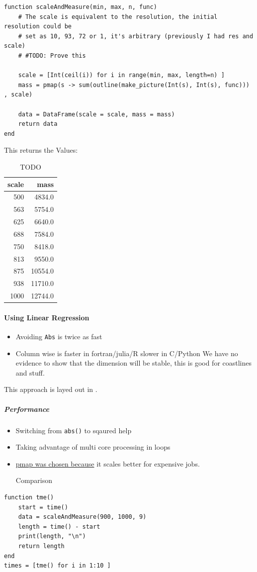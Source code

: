\documentclass[11pt]{article}
\begin{document}
\begin{verbatim}
function scaleAndMeasure(min, max, n, func)
    # The scale is equivalent to the resolution, the initial resolution could be
    # set as 10, 93, 72 or 1, it's arbitrary (previously I had res and scale)
    # #TODO: Prove this

    scale = [Int(ceil(i)) for i in range(min, max, length=n) ]
    mass = pmap(s -> sum(outline(make_picture(Int(s), Int(s), func))) , scale)

    data = DataFrame(scale = scale, mass = mass)
    return data
end

\end{verbatim}

This returns the Values:

\begin{table}[htbp]
\centering
\begin{tabular}{rr}
scale & mass\\
\hline
500 & 4834.0\\
563 & 5754.0\\
625 & 6640.0\\
688 & 7584.0\\
750 & 8418.0\\
813 & 9550.0\\
875 & 10554.0\\
938 & 11710.0\\
1000 & 12744.0\\
\end{tabular}
\caption{\label{table-of-values}TODO}

\end{table}
\paragraph{Using Linear Regression}
\label{linear-reg-julia}
\begin{itemize}
\item Avoiding \texttt{Abs} is twice as fast
\item Column wise is faster in fortran/julia/R slower in C/Python
We have no evidence to show that the dimension will be stable, this is good for coastlines and stuff.
\end{itemize}

This approach is layed out in \cite[p. 30]{vicsekFractalGrowthPhenomena1992}.
\subparagraph{Performance}
\label{sec:org960d528}
\begin{itemize}
\item Switching from \texttt{abs()} to sqaured help
\item Taking advantage of multi core processing in loops

\item \href{https://stackoverflow.com/a/55704326/12843551}{pmap was chosen because} it scales better for expensive jobs.

Comparison
\end{itemize}
\begin{verbatim}
function tme()
    start = time()
    data = scaleAndMeasure(900, 1000, 9)
    length = time() - start
    print(length, "\n")
    return length
end
times = [tme() for i in 1:10 ]
\end{verbatim}
\end{document}
